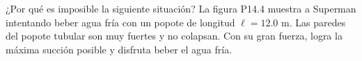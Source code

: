 \item ¿Por qué es imposible la siguiente situación? La figura P14.4 muestra a Superman intentando beber agua fría con un popote de longitud $\ell = 12.0 \text{ m}$. Las paredes del popote tubular son muy fuertes y no colapsan. Con su gran fuerza, logra la máxima succión posible y disfruta beber el agua fría.
